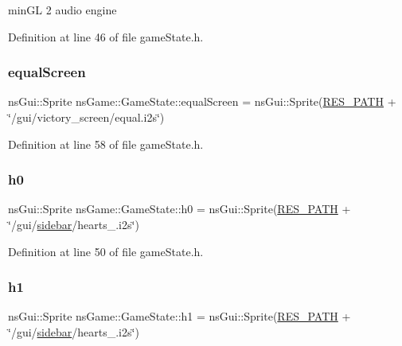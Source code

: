 min\+GL 2 audio engine 



Definition at line 46 of file game\+State.\+h.

\mbox{\label{classns_game_1_1_game_state_aa0eafc52f02691494625a63ad62cf7db}} 
\subsubsection{\texorpdfstring{equal\+Screen}{equalScreen}}
{\footnotesize\ttfamily ns\+Gui\+::\+Sprite ns\+Game\+::\+Game\+State\+::equal\+Screen = ns\+Gui\+::\+Sprite(\hyperlink{definitions_8h_a793644bd88146828177a2a4f57e3bf01}{R\+E\+S\+\_\+\+P\+A\+TH} + \char`\"{}/gui/victory\+\_\+screen/equal.\+i2s\char`\"{})}



Definition at line 58 of file game\+State.\+h.

\mbox{\label{classns_game_1_1_game_state_afaac1bf595eef244503f5b15917e230d}} 
\subsubsection{\texorpdfstring{h0}{h0}}
{\footnotesize\ttfamily ns\+Gui\+::\+Sprite ns\+Game\+::\+Game\+State\+::h0 = ns\+Gui\+::\+Sprite(\hyperlink{definitions_8h_a793644bd88146828177a2a4f57e3bf01}{R\+E\+S\+\_\+\+P\+A\+TH} + \char`\"{}/gui/\hyperlink{classns_game_1_1_game_state_a144f7f71a2a43f8422a346e4bc9bb923}{sidebar}/hearts\+\_.\+i2s\char`\"{})}



Definition at line 50 of file game\+State.\+h.

\mbox{\label{classns_game_1_1_game_state_a7d9cc08964a619c0f72a7000fe7f511c}} 
\subsubsection{\texorpdfstring{h1}{h1}}
{\footnotesize\ttfamily ns\+Gui\+::\+Sprite ns\+Game\+::\+Game\+State\+::h1 = ns\+Gui\+::\+Sprite(\hyperlink{definitions_8h_a793644bd88146828177a2a4f57e3bf01}{R\+E\+S\+\_\+\+P\+A\+TH} + \char`\"{}/gui/\hyperlink{classns_game_1_1_game_state_a144f7f71a2a43f8422a346e4bc9bb923}{sidebar}/hearts\+\_.\+i2s\char`\"{})}



